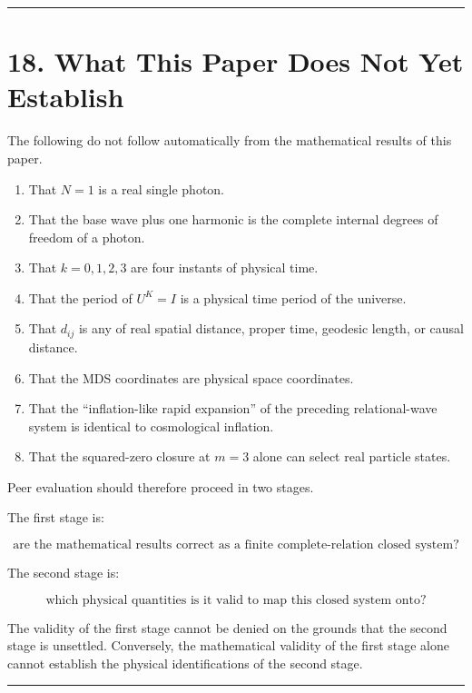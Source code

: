 \documentclass[
  a4paper,
]{article}
\providecommand{\tightlist}{%
  \setlength{\itemsep}{0pt}\setlength{\parskip}{0pt}}
\begin{document}
\begin{center}\rule{0.5\linewidth}{0.5pt}\end{center}

\section{18. What This Paper Does Not Yet
Establish}\label{what-this-paper-does-not-yet-establish}

The following do not follow automatically from the mathematical results
of this paper.

\begin{enumerate}
\def\labelenumi{\arabic{enumi}.}
\tightlist
\item
  That \(N=1\) is a real single photon.
\item
  That the base wave plus one harmonic is the complete internal degrees
  of freedom of a photon.
\item
  That \(k=0,1,2,3\) are four instants of physical time.
\item
  That the period of \(U^K=I\) is a physical time period of the
  universe.
\item
  That \(d_{ij}\) is any of real spatial distance, proper time, geodesic
  length, or causal distance.
\item
  That the MDS coordinates are physical space coordinates.
\item
  That the ``inflation-like rapid expansion'' of the preceding
  relational-wave system is identical to cosmological inflation.
\item
  That the squared-zero closure at \(m=3\) alone can select real
  particle states.
\end{enumerate}

Peer evaluation should therefore proceed in two stages.

The first stage is:

\[
\boxed{
\text{are the mathematical results correct as a finite complete-relation closed system?}
}
\]

The second stage is:

\[
\boxed{
\text{which physical quantities is it valid to map this closed system onto?}
}
\]

The validity of the first stage cannot be denied on the grounds that the
second stage is unsettled. Conversely, the mathematical validity of the
first stage alone cannot establish the physical identifications of the
second stage.

\begin{center}\rule{0.5\linewidth}{0.5pt}\end{center}
\end{document}
